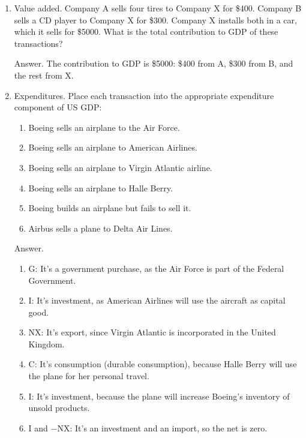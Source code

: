 \begin{enumerate}

\item Value added.  Company A sells four tires to Company X for \$400.
Company B sells a CD player to Company X for \$300.
Company X installs both in a car, which it sells for \$5000.
What is the total contribution to GDP of these transactions?

Answer.  The contribution to GDP is \$5000: \$400 from A, \$300 from B,
and the rest from X.

\item Expenditures.
Place each transaction into the appropriate expenditure component of US GDP:%
%
\begin{enumerate}
\item Boeing sells an airplane to the Air Force.%
\item Boeing sells an airplane to American Airlines.%
\item Boeing sells an airplane to Virgin Atlantic airline.%
\item Boeing sells an airplane to Halle Berry.%
\item Boeing builds an airplane but fails to sell it.%
\item Airbus sells a plane to Delta Air Lines.
\end{enumerate}

Answer.
%
\begin{enumerate}
\item G:  It's a government purchase, as the Air Force is part of the Federal Government.%
\item I: It's investment, as American Airlines will use the aircraft as capital good.%
\item NX: It's export, since Virgin Atlantic is incorporated in the United Kingdom.%
\item C: It's consumption (durable consumption), because Halle Berry will use the plane for her personal travel.%
\item I: It's investment, because the plane will increase Boeing's inventory of unsold products.%
\item I and $-$NX:  It's an investment and an import, so the net is zero.
\end{enumerate}



\end{enumerate}
